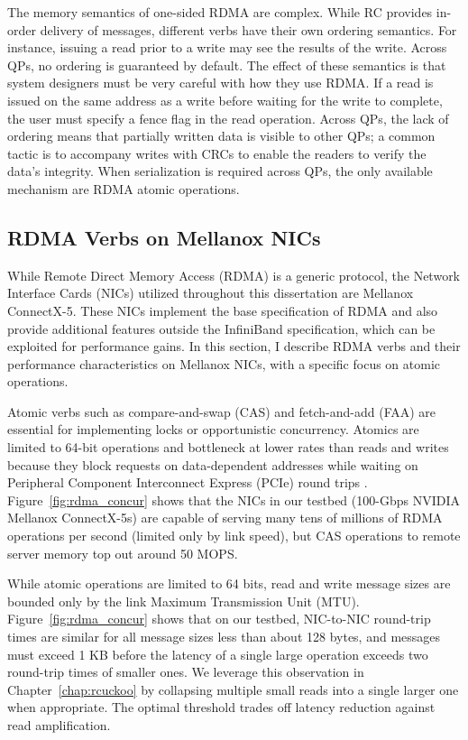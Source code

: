 \documentclass[12pt]{ucsddissertation}
\begin{document}
The memory semantics of one-sided RDMA are complex. While RC provides in-order delivery of messages,
different verbs have their own ordering semantics. For instance, issuing a read prior to a write may
see the results of the write. Across QPs, no ordering is guaranteed by default. The effect of these
semantics is that system designers must be very careful with how they use RDMA. If a read is issued
on the same address as a write before waiting for the write to complete, the user must specify a
fence flag in the read operation. Across QPs, the lack of ordering means that partially written data
is visible to other QPs; a common tactic is to accompany writes with CRCs to enable the readers to
verify the data's integrity. When serialization is required across QPs, the only available mechanism
are RDMA atomic operations.



\subsection{RDMA Verbs on Mellanox NICs}


While Remote Direct Memory Access (RDMA) is a generic protocol, the Network Interface Cards (NICs)
utilized throughout this dissertation are Mellanox ConnectX-5. These NICs implement the base
specification of RDMA and also provide additional features outside the InfiniBand specification,
which can be exploited for performance gains. In this section, I describe RDMA verbs and their
performance characteristics on Mellanox NICs, with a specific focus on atomic operations.

Atomic verbs such as compare-and-swap (CAS) and fetch-and-add (FAA) are essential for implementing
locks or opportunistic concurrency. Atomics are limited to 64-bit operations and bottleneck at lower
rates than reads and writes because they block requests on data-dependent addresses while waiting on
Peripheral Component Interconnect Express (PCIe) round trips \cite{design-guidelines,sherman}.
Figure~\ref{fig:rdma_concur} shows that the NICs in our testbed (100-Gbps NVIDIA Mellanox ConnectX-5s) are
capable of serving many tens of millions of RDMA operations per second (limited only by link speed),
but CAS operations to remote server memory top out around 50 MOPS.

While atomic operations are limited to 64 bits, read and write message sizes are bounded only by the
link Maximum Transmission Unit (MTU). Figure~\ref{fig:rdma_concur} shows that on our testbed, NIC-to-NIC
round-trip times are similar for all message sizes less than about 128 bytes, and messages must
exceed 1 KB before the latency of a single large operation exceeds two round-trip times of smaller
ones. We leverage this observation in Chapter~\ref{chap:rcuckoo} by collapsing multiple small reads into a
single larger one when appropriate. The optimal threshold trades off latency reduction against read
amplification.
\end{document}
